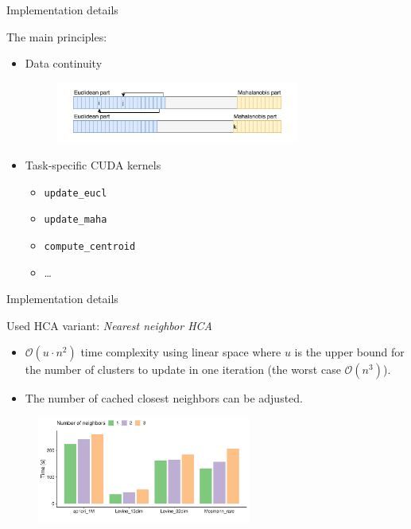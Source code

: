 \documentclass[10pt]{beamer}
\begin{document}
\begin{frame}{Implementation details}
	
	The main principles:
	\begin{itemize}
		\item Data continuity
		\begin{figure}
			\includegraphics[width=8cm]{../img/data}
		\end{figure}
		
		\item Task-specific CUDA kernels
		\begin{itemize}
			\item \texttt{update\_eucl}
			\item \texttt{update\_maha}
			\item \texttt{compute\_centroid}
			\item \dots
		\end{itemize}
	\end{itemize}

\end{frame}

\begin{frame}{Implementation details}
	
	Used HCA variant: \emph{Nearest neighbor HCA}
	\begin{itemize}
		\item $\mathcal{O}(u\cdot n^2)$ time complexity using linear space where $u$ is the upper bound for the number of clusters to update in one iteration (the worst case $\mathcal{O}(n^3)$).
		\item The number of cached closest neighbors can be adjusted.
	\end{itemize}

	\begin{figure}
		\includegraphics[width=7cm]{../img/neighbor_compare}
	\end{figure}
	
\end{frame}
\end{document}
